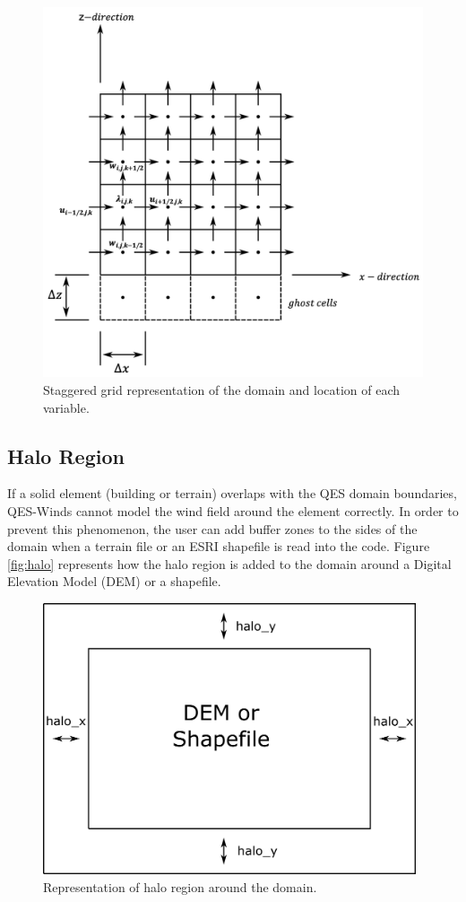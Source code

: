 \begin{figure}[h!]
\includegraphics[width=\textwidth,keepaspectratio]{Images/staggered_grid_full.png}
\caption{Staggered grid representation of the domain and location of each variable.}
\end{figure}

\subsection{Halo Region}

If a solid element (building or terrain) overlaps with the QES domain boundaries, QES-Winds cannot model the wind field around the element correctly. In order to prevent this phenomenon, the user can add buffer zones to the sides of the domain when a terrain file or an ESRI shapefile is read into the code. Figure \ref{fig:halo} represents how the halo region is added to the domain around a Digital Elevation Model (DEM) or a shapefile.

\begin{figure}[h!]
\centering
\includegraphics[width=11.0cm,keepaspectratio]{Images/domain_halo.png}
\caption{Representation of halo region around the domain.}
\end{figure}

